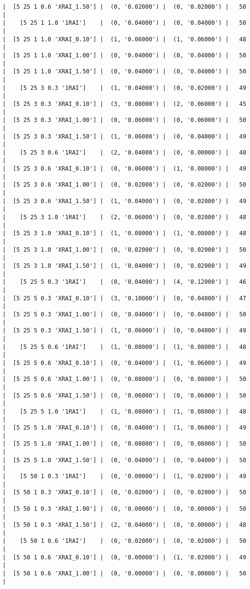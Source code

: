 \documentclass{article}
\begin{document}
\begin{verbatim}
|  [5 25 1 0.6 'XRAI_1.50'] |  (0, '0.02000') |  (0, '0.02000') |   50  |
|    [5 25 1 1.0 '1RAI']    |  (0, '0.04000') |  (0, '0.04000') |   50  |
|  [5 25 1 1.0 'XRAI_0.10'] |  (1, '0.06000') |  (1, '0.06000') |   48  |
|  [5 25 1 1.0 'XRAI_1.00'] |  (0, '0.04000') |  (0, '0.04000') |   50  |
|  [5 25 1 1.0 'XRAI_1.50'] |  (0, '0.04000') |  (0, '0.04000') |   50  |
|    [5 25 3 0.3 '1RAI']    |  (1, '0.04000') |  (0, '0.02000') |   49  |
|  [5 25 3 0.3 'XRAI_0.10'] |  (3, '0.08000') |  (2, '0.06000') |   45  |
|  [5 25 3 0.3 'XRAI_1.00'] |  (0, '0.06000') |  (0, '0.06000') |   50  |
|  [5 25 3 0.3 'XRAI_1.50'] |  (1, '0.06000') |  (0, '0.04000') |   49  |
|    [5 25 3 0.6 '1RAI']    |  (2, '0.04000') |  (0, '0.00000') |   48  |
|  [5 25 3 0.6 'XRAI_0.10'] |  (0, '0.06000') |  (1, '0.08000') |   49  |
|  [5 25 3 0.6 'XRAI_1.00'] |  (0, '0.02000') |  (0, '0.02000') |   50  |
|  [5 25 3 0.6 'XRAI_1.50'] |  (1, '0.04000') |  (0, '0.02000') |   49  |
|    [5 25 3 1.0 '1RAI']    |  (2, '0.06000') |  (0, '0.02000') |   48  |
|  [5 25 3 1.0 'XRAI_0.10'] |  (1, '0.08000') |  (1, '0.08000') |   48  |
|  [5 25 3 1.0 'XRAI_1.00'] |  (0, '0.02000') |  (0, '0.02000') |   50  |
|  [5 25 3 1.0 'XRAI_1.50'] |  (1, '0.04000') |  (0, '0.02000') |   49  |
|    [5 25 5 0.3 '1RAI']    |  (0, '0.04000') |  (4, '0.12000') |   46  |
|  [5 25 5 0.3 'XRAI_0.10'] |  (3, '0.10000') |  (0, '0.04000') |   47  |
|  [5 25 5 0.3 'XRAI_1.00'] |  (0, '0.04000') |  (0, '0.04000') |   50  |
|  [5 25 5 0.3 'XRAI_1.50'] |  (1, '0.06000') |  (0, '0.04000') |   49  |
|    [5 25 5 0.6 '1RAI']    |  (1, '0.08000') |  (1, '0.08000') |   48  |
|  [5 25 5 0.6 'XRAI_0.10'] |  (0, '0.04000') |  (1, '0.06000') |   49  |
|  [5 25 5 0.6 'XRAI_1.00'] |  (0, '0.08000') |  (0, '0.08000') |   50  |
|  [5 25 5 0.6 'XRAI_1.50'] |  (0, '0.06000') |  (0, '0.06000') |   50  |
|    [5 25 5 1.0 '1RAI']    |  (1, '0.08000') |  (1, '0.08000') |   48  |
|  [5 25 5 1.0 'XRAI_0.10'] |  (0, '0.04000') |  (1, '0.06000') |   49  |
|  [5 25 5 1.0 'XRAI_1.00'] |  (0, '0.08000') |  (0, '0.08000') |   50  |
|  [5 25 5 1.0 'XRAI_1.50'] |  (0, '0.04000') |  (0, '0.04000') |   50  |
|    [5 50 1 0.3 '1RAI']    |  (0, '0.00000') |  (1, '0.02000') |   49  |
|  [5 50 1 0.3 'XRAI_0.10'] |  (0, '0.02000') |  (0, '0.02000') |   50  |
|  [5 50 1 0.3 'XRAI_1.00'] |  (0, '0.00000') |  (0, '0.00000') |   50  |
|  [5 50 1 0.3 'XRAI_1.50'] |  (2, '0.04000') |  (0, '0.00000') |   48  |
|    [5 50 1 0.6 '1RAI']    |  (0, '0.02000') |  (0, '0.02000') |   50  |
|  [5 50 1 0.6 'XRAI_0.10'] |  (0, '0.00000') |  (1, '0.02000') |   49  |
|  [5 50 1 0.6 'XRAI_1.00'] |  (0, '0.00000') |  (0, '0.00000') |   50  |

\end{verbatim}
\end{document}
